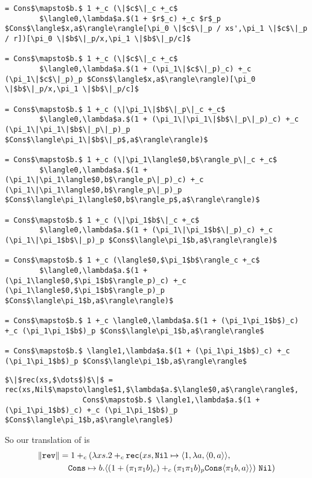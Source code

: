 \begin{lstlisting}
= Cons$\mapsto$b.$ 1 +_c (\|$c$\|_c +_c$
        $\langle0,\lambda$a.$(1 + $r$_c) +_c $r$_p $Cons$\langle$x,a$\rangle\rangle[\pi_0 \|$c$\|_p / xs',\pi_1 \|$c$\|_p / r])[\pi_0 \|$b$\|_p/x,\pi_1 \|$b$\|_p/c]$

= Cons$\mapsto$b.$ 1 +_c (\|$c$\|_c +_c$
        $\langle0,\lambda$a.$(1 + (\pi_1\|$c$\|_p)_c) +_c (\pi_1\|$c$\|_p)_p $Cons$\langle$x,a$\rangle\rangle)[\pi_0 \|$b$\|_p/x,\pi_1 \|$b$\|_p/c]$

= Cons$\mapsto$b.$ 1 +_c (\|\pi_1\|$b$\|_p\|_c +_c$
        $\langle0,\lambda$a.$(1 + (\pi_1\|\pi_1\|$b$\|_p\|_p)_c) +_c (\pi_1\|\pi_1\|$b$\|_p\|_p)_p $Cons$\langle\pi_1\|$b$\|_p$,a$\rangle\rangle)$

= Cons$\mapsto$b.$ 1 +_c (\|\pi_1\langle$0,b$\rangle_p\|_c +_c$
        $\langle0,\lambda$a.$(1 + (\pi_1\|\pi_1\langle$0,b$\rangle_p\|_p)_c) +_c (\pi_1\|\pi_1\langle$0,b$\rangle_p\|_p)_p $Cons$\langle\pi_1\langle$0,b$\rangle_p$,a$\rangle\rangle)$

= Cons$\mapsto$b.$ 1 +_c (\|\pi_1$b$\|_c +_c$
        $\langle0,\lambda$a.$(1 + (\pi_1\|\pi_1$b$\|_p)_c) +_c (\pi_1\|\pi_1$b$\|_p)_p $Cons$\langle\pi_1$b,a$\rangle\rangle)$

= Cons$\mapsto$b.$ 1 +_c (\langle$0,$\pi_1$b$\rangle_c +_c$
        $\langle0,\lambda$a.$(1 + (\pi_1\langle$0,$\pi_1$b$\rangle_p)_c) +_c (\pi_1\langle$0,$\pi_1$b$\rangle_p)_p $Cons$\langle\pi_1$b,a$\rangle\rangle)$

= Cons$\mapsto$b.$ 1 +_c \langle0,\lambda$a.$(1 + (\pi_1\pi_1$b$)_c) +_c (\pi_1\pi_1$b$)_p $Cons$\langle\pi_1$b,a$\rangle\rangle$

= Cons$\mapsto$b.$ \langle1,\lambda$a.$(1 + (\pi_1\pi_1$b$)_c) +_c (\pi_1\pi_1$b$)_p $Cons$\langle\pi_1$b,a$\rangle\rangle$
\end{lstlisting}
%
\begin{lstlisting}
$\|$rec(xs,$\dots$)$\|$ = rec(xs,Nil$\mapsto\langle$1,$\lambda$a.$\langle$0,a$\rangle\rangle$,
                  Cons$\mapsto$b.$ \langle1,\lambda$a.$(1 + (\pi_1\pi_1$b$)_c) +_c (\pi_1\pi_1$b$)_p $Cons$\langle\pi_1$b,a$\rangle\rangle$)
\end{lstlisting}
%
So our translation of  is
%
\begin{align*}
  \|\T{rev}\| &= 1 +_c (\lambda xs.2 +_c \T{rec}(xs, \T{Nil}\mapsto \langle 1, \lambda a, \langle 0, a \rangle\rangle,\\
              &\quad \T{Cons}\mapsto b.\langle (1 + (\pi_1\pi_1 b)_c) +_c (\pi_1\pi_1 b)_p \T{Cons}\langle \pi_1 b, a\rangle\rangle)\ \T{Nil})
\end{align*}
%
%

